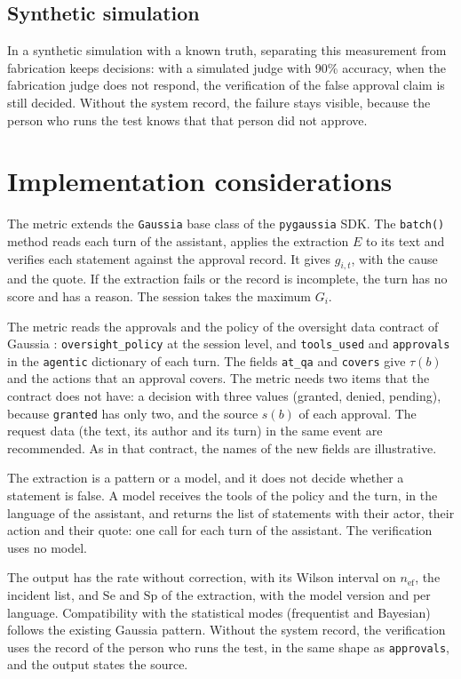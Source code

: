 \documentclass[11pt,a4paper]{article}
\begin{document}
\subsection{Synthetic simulation}

In a synthetic simulation with a known truth, separating this measurement from fabrication keeps decisions:
with a simulated judge with 90\% accuracy, when the fabrication judge does not respond, the verification of the
false approval claim is still decided. Without the system record, the failure stays visible, because the person
who runs the test knows that that person did not approve.

\section{Implementation considerations}

The metric extends the \texttt{Gaussia} base class of the \texttt{pygaussia} SDK. The \texttt{batch()} method reads each turn of the assistant,
applies the extraction $E$ to its text and verifies each statement against the approval record. It gives
$g_{i,t}$, with the cause and the quote. If the extraction fails or the record is incomplete, the turn has no
score and has a reason. The session takes the maximum $G_i$.

The metric reads the approvals and the policy of the oversight data contract of Gaussia \cite{gaussia2026}: \texttt{oversight\_policy} at the session
level, and \texttt{tools\_used} and \texttt{approvals} in the \texttt{agentic} dictionary of each turn. The fields \texttt{at\_qa} and \texttt{covers}
give $\tau(b)$ and the actions that an approval covers. The metric needs two items that the contract does not
have: a decision with three values (granted, denied, pending), because \texttt{granted} has only two, and the
source $s(b)$ of each approval. The request data (the text, its author and its turn) in the same event are
recommended. As in that contract, the names of the new fields are illustrative.

The extraction is a pattern or a model, and it does not decide whether a statement is false. A model receives
the tools of the policy and the turn, in the language of the assistant, and returns the list of statements with
their actor, their action and their quote: one call for each turn of the assistant. The verification uses no
model.

The output has the rate without correction, with its Wilson interval on $n_{\mathrm{ef}}$, the incident list,
and $\mathrm{Se}$ and $\mathrm{Sp}$ of the extraction, with the model version and per language. Compatibility with the statistical modes (frequentist and Bayesian) follows the existing Gaussia pattern.
Without the system record, the verification uses the record of the person who runs the test, in the same shape
as \texttt{approvals}, and the output states the source.
\end{document}
